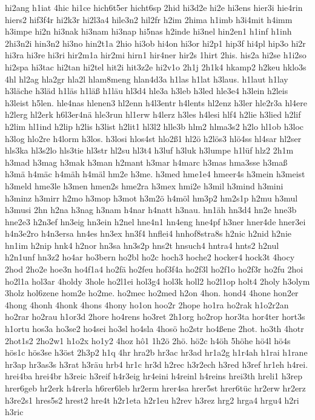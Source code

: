 {hi2ang
h1iat
4hic
hi1ce
hich6t5er
hicht6sp
2hid
hi3d2e
hi2e
hi3ens
hier3i
hie4rin
hiers2
hif3f4r
hi2k3r
hi2l3a4
hile3n2
hil2fr
h2im
2hima
h1imb
h3i4mit
h4imm
h3impe
hi2n
hi3nak
hi3nam
hi3nap
hi5nas
h2inde
hi3nel
hin2en1
h1inf
h1inh
2hi3n2i
hin3n2
hi3no
hin2t1a
2hio
hi3ob
hi4on
hi3or
hi2p1
hip3f
hi4pl
hip3o
hi2r
hi3ra
hi3re
hi3ri
hir2m1a
hir2mi
hirn1
hir4ner
hir2s
1hirt
2his.
his2a
hi2se
h1i2so
hi2spa
hi3tac
hi2tan
hi2tel
hit2i
hit3z2e
hi2v1o
2h1j
2h1k4
hkamp2
h2keu
hklo3s
4hl
hl2ag
hla2gr
hla2l
hlam8meng
hlan4d3a
h1las
h1lat
h3laus.
h1laut
h1lay
h3läche
h3läd
h1läs
h1läß
h1läu
hl3d4
hle3a
h3leb
h3led
hle3e4
h3lein
h2leis
h3leist
h5len.
hle4nas
hlenen3
hl2enn
h4l3entr
h4lents
hl2enz
h3ler
hle2r3a
hl4ere
h2lerg
hl2erk
h6l3er4nä
hle3run
hl1erw
h4lerz
h3les
h4lesi
hlf4
h2lie
h3lied
h2lif
h2lim
hl1ind
h2lip
h2lis
h3list
h2lit1
hl3l2
hlle3b
hlm2
hlma3s2
h2lo
hl1ob
h3loc
h3log
hlo2re
h4lorm
h3los.
h3losi
hlos4st
hlo2ß1
hl2ö
h2lös3
hlö4ss
hl4sar
hl2ser
hls3ka
hl3s2lo
hls3tie
hl3str
hl2su
hl3t4
h3luf
h3luk
h3lumpe
h1lüf
hlz2
2h1m
h3mad
h3mag
h3mak
h3man
h2mant
h3mar
h4marc
h3mas
hma3sse
h3maß
h3mä
h4mäc
h4mäh
h4mäl
hm2e
h3me.
h3med
hme1e4
hmeer4s
h3mein
h3meist
h3meld
hme3le
h3men
hmen2s
hme2ra
h3mex
hmi2e
h3mil
h3mind
h3mini
h3minz
h3mirr
h2mo
h3mop
h3mot
h3m2ö
h4möl
hm3p2
hm2s1p
h2mu
h3mul
h3musi
2hn
h2na
h3nag
h3nam
h4nar
h4natt
h3nau.
hn1äh
hn3d4
hn2e
hne3b
hne2e3
h2n3ef
hn3eig
hn3ein
h2nel
hne4n1
hn4eng
hne4pf
h3ner
hner4de
hner3ei
h4n3e2ro
h4n3ersa
hn4es
hn3ex
hn3f4
hnflei4
hnhof8stra8s
h2nic
h2nid
h2nie
hn1im
h2nip
hnk4
h2nor
hn3sa
hn3s2p
hns2t
hnsuch4
hntra4
hnts2
h2nul
h2n1unf
hn3z2
ho4ar
ho3bern
ho2bl
ho2c
hoch3
hoche2
hocker4
hock3t
4hocy
2hod
2ho2e
hoe3n
ho4f1a4
ho2fä
ho2feu
hof3f4a
ho2f3l
ho2f1o
ho2f3r
ho2fu
2hoi
ho2l1a
hol3ar
4holdy
3hole
ho2l1ei
hol3g4
hol3k
holl2
ho2l1op
holt4
2holy
h3olym
3holz
hol6zene
hom2e
ho2me.
ho2mec
ho2med
h2on
4hon.
hond4
4hone
hon2er
4hong
4honh
4honk
4hons
4hony
ho1on
hoo2r
2hope
ho1ra
ho2rak
h1o2r2an
ho2rar
ho2rau
h1or3d
2hore
ho4rens
ho3ret
2h1org
ho2rop
hor3ta
hor4ter
hort3s
h1ortu
hos3a
ho3se2
ho4sei
ho3sl
ho4sla
4hosö
ho2str
ho4ßene
2hot.
ho3th
4hotr
2hot1s2
2ho2w1
h1o2x
ho1y2
4hoz
hô1
1h2ö
2hö.
hö2c
h4öh
5höhe
hö4l
hö4s
hös1c
hös3se
h3öst
2h3p2
h1q
4hr
hra2b
hr3ac
hr3ad
hr1a2g
h1r4ah
h1rai
h1rane
hr3ap
hr3as3s
h3rat
h3räu
hrb4
hr1c
hr3d
h2rec
h3r2ech
h3red
h3ref
hr1eh
h4rei.
hrei4ba
hrei4br
h3reic
h3reif
h4r3eig
hr4eini
h4reinl
h4reins
hrei3th
hreli1
h3rep
hrer6geb
hr2erk
h4rerla
h6rer6leb
hr2erm
hrer4sa
hrer5st
hrer6tüc
hr2erw
hr2erz
h3re2s1
hres5s2
hrest2
hre4t
h2r1eta
h2r1eu
h2rev
h3rez
hrg2
hrga4
hrgu4
h2ri
h3ric
}

